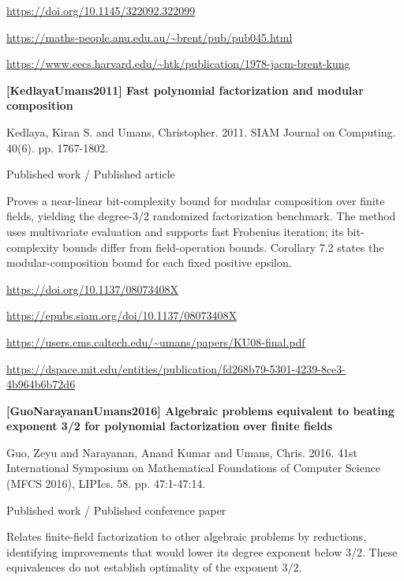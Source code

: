 \documentclass[11pt,a4paper,oneside,openany]{book}
\begin{document}
{\footnotesize\url{https://doi.org/10.1145/322092.322099}}\par
{\footnotesize\url{https://maths-people.anu.edu.au/~brent/pub/pub045.html}}\par
{\footnotesize\url{https://www.eecs.harvard.edu/~htk/publication/1978-jacm-brent-kung}}\par
\vspace{9pt}
\hypertarget{ref:KedlayaUmans2011}{}
{\sffamily\bfseries\color{atlasgreen}[KedlayaUmans2011] Fast polynomial factorization and modular composition}\par
\color{black} Kedlaya, Kiran S. and Umans, Christopher. 2011. SIAM Journal on Computing. 40(6). pp. 1767-1802.\par
{\small\sffamily\color{atlasgold}Published work / Published article}\par
\color{black} Proves a near-linear bit-complexity bound for modular composition over finite fields, yielding the degree-3/2 randomized factorization benchmark. The method uses multivariate evaluation and supports fast Frobenius iteration; its bit-complexity bounds differ from field-operation bounds. Corollary 7.2 states the modular-composition bound for each fixed positive epsilon.\par
{\footnotesize\url{https://doi.org/10.1137/08073408X}}\par
{\footnotesize\url{https://epubs.siam.org/doi/10.1137/08073408X}}\par
{\footnotesize\url{https://users.cms.caltech.edu/~umans/papers/KU08-final.pdf}}\par
{\footnotesize\url{https://dspace.mit.edu/entities/publication/fd268b79-5301-4239-8ce3-4b964b6b72d6}}\par
\vspace{9pt}
\hypertarget{ref:GuoNarayananUmans2016}{}
{\sffamily\bfseries\color{atlasgreen}[GuoNarayananUmans2016] Algebraic problems equivalent to beating exponent 3/2 for polynomial factorization over finite fields}\par
\color{black} Guo, Zeyu and Narayanan, Anand Kumar and Umans, Chris. 2016. 41st International Symposium on Mathematical Foundations of Computer Science (MFCS 2016), LIPIcs. 58. pp. 47:1-47:14.\par
{\small\sffamily\color{atlasgold}Published work / Published conference paper}\par
\color{black} Relates finite-field factorization to other algebraic problems by reductions, identifying improvements that would lower its degree exponent below 3/2. These equivalences do not establish optimality of the exponent 3/2.\par
\end{document}
